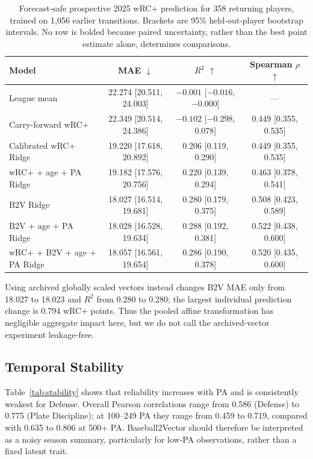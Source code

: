 \documentclass[10pt,twocolumn,letterpaper]{article}
\begin{document}
\begin{table}[t]
\centering
\caption{Forecast-safe prospective 2025 wRC+ prediction for 358 returning players, trained on 1{,}056 earlier transitions. Brackets are 95\% held-out-player bootstrap intervals. No row is bolded because paired uncertainty, rather than the best point estimate alone, determines comparisons.}
\label{tab:prospective}
\scriptsize
\begin{tabular}{lccc}
\toprule
Model & MAE $\downarrow$ & $R^2$ $\uparrow$ & Spearman $\rho$ $\uparrow$ \\
\midrule
League mean & 22.274 [20.511, 24.003] & $-0.001$ [$-0.016$, $-0.000$] & --- \\
Carry-forward wRC+ & 22.349 [20.514, 24.386] & $-0.102$ [$-0.298$, 0.078] & 0.449 [0.355, 0.535] \\
Calibrated wRC+ Ridge & 19.220 [17.618, 20.892] & 0.206 [0.119, 0.290] & 0.449 [0.355, 0.535] \\
wRC+ + age + PA Ridge & 19.182 [17.576, 20.756] & 0.220 [0.139, 0.294] & 0.463 [0.378, 0.541] \\
B2V Ridge & 18.027 [16.514, 19.681] & 0.280 [0.179, 0.375] & 0.508 [0.423, 0.589] \\
B2V + age + PA Ridge & 18.028 [16.528, 19.634] & 0.288 [0.192, 0.381] & 0.522 [0.438, 0.600] \\
wRC+ + B2V + age + PA Ridge & 18.057 [16.561, 19.654] & 0.286 [0.190, 0.378] & 0.520 [0.435, 0.600] \\
\bottomrule
\end{tabular}
\end{table}

Using archived globally scaled vectors instead changes B2V MAE only from 18.027 to 18.023 and $R^2$ from 0.280 to 0.280; the largest individual prediction change is 0.794 wRC+ points. Thus the pooled affine transformation has negligible aggregate impact here, but we do not call the archived-vector experiment leakage-free.

\subsection{Temporal Stability}
Table~\ref{tab:stability} shows that reliability increases with PA and is consistently weakest for Defense. Overall Pearson correlations range from 0.586 (Defense) to 0.775 (Plate Discipline); at 100--249 PA they range from 0.459 to 0.719, compared with 0.635 to 0.806 at 500+ PA. Baseball2Vector should therefore be interpreted as a noisy season summary, particularly for low-PA observations, rather than a fixed latent trait.
\end{document}
